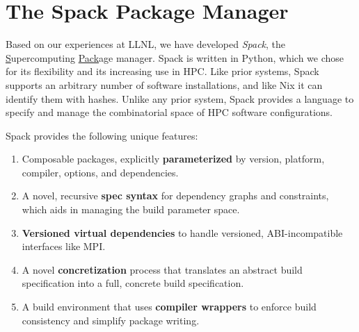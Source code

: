 
\section{The Spack Package Manager}
\label{sec:implementation}
Based on our experiences at LLNL, we have developed
{\it Spack}, the \underline{S}upercomputing \underline{Pack}age manager.
Spack is written in Python, which we chose for its flexibility
and its increasing use in HPC.
%
Like prior systems, Spack supports an arbitrary number of software
installations, and like Nix it can identify them with hashes.  Unlike any
prior system, Spack provides a language to specify and manage the
combinatorial space of HPC software configurations.

\noindent
Spack provides the following unique features:
\begin{enumerate}
\item Composable packages, explicitly {\bf parameterized} by version, platform,
      compiler, options, and dependencies.
\item A novel, recursive {\bf spec syntax} for dependency graphs and constraints,
      which aids in managing the build parameter space.
\item {\bf Versioned virtual dependencies} to handle versioned, 
      ABI-incompatible interfaces like MPI.
\item A novel {\bf concretization} process that translates an abstract build
      specification into a full, concrete build specification.
\item A build environment that uses {\bf compiler wrappers} to enforce build
      consistency and simplify package writing.
\end{enumerate}






